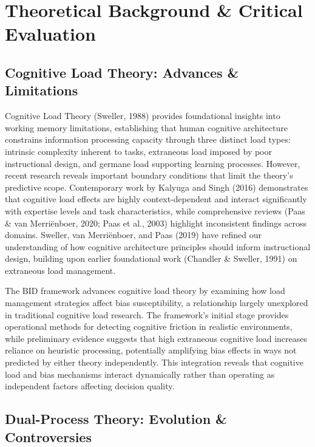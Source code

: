 \documentclass[
  authoryear,
  preprint]{elsarticle}
\begin{document}
\section{Theoretical Background \& Critical
Evaluation}\label{theoretical-background-critical-evaluation}

\subsection{Cognitive Load Theory: Advances \&
Limitations}\label{cognitive-load-theory-advances-limitations}

Cognitive Load Theory (Sweller, 1988) provides foundational insights
into working memory limitations, establishing that human cognitive
architecture constrains information processing capacity through three
distinct load types: intrinsic complexity inherent to tasks, extraneous
load imposed by poor instructional design, and germane load supporting
learning processes. However, recent research reveals important boundary
conditions that limit the theory's predictive scope. Contemporary work
by Kalyuga and Singh (2016) demonstrates that cognitive load effects are
highly context-dependent and interact significantly with expertise
levels and task characteristics, while comprehensive reviews (Paas \&
van Merriënboer, 2020; Paas et al., 2003) highlight inconsistent
findings across domains. Sweller, van Merriënboer, and Paas (2019) have
refined our understanding of how cognitive architecture principles
should inform instructional design, building upon earlier foundational
work (Chandler \& Sweller, 1991) on extraneous load management.

The BID framework advances cognitive load theory by examining how load
management strategies affect bias susceptibility, a relationship largely
unexplored in traditional cognitive load research. The framework's
initial stage provides operational methods for detecting cognitive
friction in realistic environments, while preliminary evidence suggests
that high extraneous cognitive load increases reliance on heuristic
processing, potentially amplifying bias effects in ways not predicted by
either theory independently. This integration reveals that cognitive
load and bias mechanisms interact dynamically rather than operating as
independent factors affecting decision quality.

\subsection{Dual-Process Theory: Evolution \&
Controversies}\label{dual-process-theory-evolution-controversies}
\end{document}
